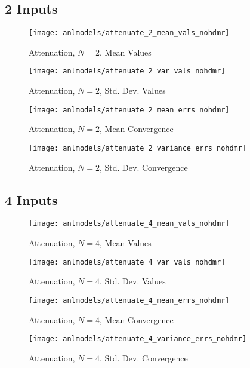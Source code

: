 \subsection{2 Inputs}
\begin{figure}[H]
  \centering
  \texttt{[image: anlmodels/attenuate\_2\_mean\_vals\_nohdmr]}
  \caption{Attenuation, $N=2$, Mean Values}
  \label{fig:attenuate mean values 2}
\end{figure}
\begin{figure}[H]
  \centering
  \texttt{[image: anlmodels/attenuate\_2\_var\_vals\_nohdmr]}
  \caption{Attenuation, $N=2$, Std. Dev. Values}
  \label{fig:attenuate var values 2}
\end{figure}

\begin{figure}[H]
  \centering
  \texttt{[image: anlmodels/attenuate\_2\_mean\_errs\_nohdmr]}
  \caption{Attenuation, $N=2$, Mean Convergence}
  \label{fig:attenuate mean errors 2}
\end{figure}
\begin{figure}[H]
  \centering
  \texttt{[image: anlmodels/attenuate\_2\_variance\_errs\_nohdmr]}
  \caption{Attenuation, $N=2$, Std. Dev. Convergence}
  \label{fig:attenuate var errors 2}
\end{figure}


\subsection{4 Inputs}
\begin{figure}[H]
  \centering
  \texttt{[image: anlmodels/attenuate\_4\_mean\_vals\_nohdmr]}
  \caption{Attenuation, $N=4$, Mean Values}
  \label{fig:attenuate mean values 4}
\end{figure}
\begin{figure}[H]
  \centering
  \texttt{[image: anlmodels/attenuate\_4\_var\_vals\_nohdmr]}
  \caption{Attenuation, $N=4$, Std. Dev. Values}
  \label{fig:attenuate var values 4}
\end{figure}

\begin{figure}[H]
  \centering
  \texttt{[image: anlmodels/attenuate\_4\_mean\_errs\_nohdmr]}
  \caption{Attenuation, $N=4$, Mean Convergence}
  \label{fig:attenuate mean errors 4}
\end{figure}
\begin{figure}[H]
  \centering
  \texttt{[image: anlmodels/attenuate\_4\_variance\_errs\_nohdmr]}
  \caption{Attenuation, $N=4$, Std. Dev. Convergence}
  \label{fig:attenuate var errors 4}
\end{figure}

